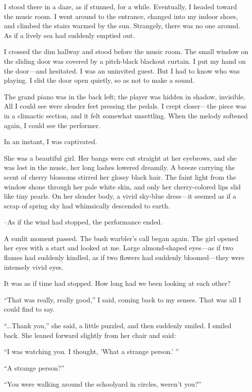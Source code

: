 \documentclass[
    a4paper,
    12pt,
    twoside,
    openany,
    UTF8,
    fontset=windows
]{ctexbook}
\begin{document}
I stood there in a daze, as if stunned, for a while. Eventually, I headed toward the music room. I went around to the entrance, changed into my indoor shoes, and climbed the stairs warmed by the sun. Strangely, there was no one around. As if a lively sea had suddenly emptied out.

I crossed the dim hallway and stood before the music room. The small window on the sliding door was covered by a pitch-black blackout curtain. I put my hand on the door---and hesitated. I was an uninvited guest. But I had to know who was playing. I slid the door open quietly, so as not to make a sound.

The grand piano was in the back left; the player was hidden in shadow, invisible. All I could see were slender feet pressing the pedals. I crept closer---the piece was in a climactic section, and it felt somewhat unsettling. When the melody softened again, I could see the performer.

In an instant, I was captivated.

She was a beautiful girl. Her bangs were cut straight at her eyebrows, and she was lost in the music, her long lashes lowered dreamily. A breeze carrying the scent of cherry blossoms stirred her glossy black hair. The faint light from the window shone through her pale white skin, and only her cherry-colored lips slid like tiny pearls. On her slender body, a vivid sky-blue dress---it seemed as if a scrap of spring sky had whimsically descended to earth.

\---As if the wind had stopped, the performance ended.

A sunlit moment passed. The bush warbler's call began again. The girl opened her eyes with a start and looked at me. Large almond-shaped eyes---as if two flames had suddenly kindled, as if two flowers had suddenly bloomed---they were intensely vivid eyes.

It was as if time had stopped. How long had we been looking at each other?

``That was really, really good,'' I said, coming back to my senses. That was all I could find to say.

``...Thank you,'' she said, a little puzzled, and then suddenly smiled. I smiled back. She leaned forward slightly from her chair and said:

``I was watching you. I thought, 'What a strange person.' ''

``A strange person?''

``You were walking around the schoolyard in circles, weren't you?''
\end{document}
